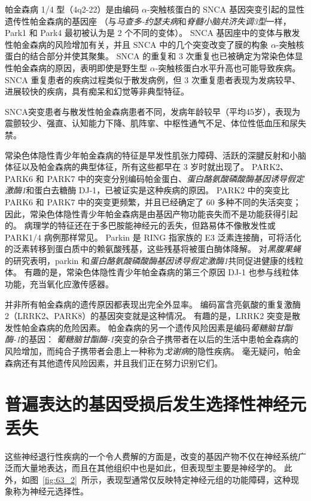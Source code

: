 帕金森病 1/4 型（4q2-22）是由编码 $\alpha$-突触核蛋白的 SNCA 基因突变引起的显性遗传性帕金森病的基因座
（与\textit{马查多-约瑟夫病}和\textit{脊髓小脑共济失调3型}一样，Park1 和 Park4 最初被认为是 2 个不同的变体）。
SNCA 基因座中的变体与散发性帕金森病的风险增加有关，并且 SNCA 中的几个突变改变了膜的构象 $\alpha$-突触核蛋白的结合部分并使其聚集。
SNCA 的重复和 3 次重复也已被确定为常染色体显性帕金森病的原因，表明即使是野生型 $\alpha$-突触核蛋白水平升高也可能导致疾病。
SNCA 重复患者的疾病过程类似于散发病例，但 3 次重复患者表现为发病较早、进展较快的疾病，具有痴呆和幻觉等非典型特征。


SNCA突变患者与散发性帕金森病患者不同，发病年龄较早（平均45岁），表现为震颤较少、强直、认知能力下降、肌阵挛、中枢性通气不足、体位性低血压和尿失禁。


常染色体隐性青少年帕金森病的特征是早发性肌张力障碍、活跃的深腱反射和小脑体征以及帕金森病的典型体征，所有这些都早在 3 岁时就出现了。
PARK2、PARK6 和 PARK7 中的突变分别编码帕金蛋白、\textit{蛋白酪氨酸磷酸酶基因诱导假定激酶1}和蛋白去糖酶 DJ-1，已被证实是这种疾病的原因。
PARK2 中的突变比 PARK6 和 PARK7 中的突变更频繁，并且已经确定了 60 多种不同的失活突变；
因此，常染色体隐性青少年帕金森病是由基因产物功能丧失而不是功能获得引起的。
病理学的特征还在于多巴胺能神经元的丢失，但路易体不像散发性或 PARK1/4 病例那样常见。
Parkin 是 RING 指家族的 E3 泛素连接酶，可将活化的泛素转移到蛋白质中的赖氨酸残基，这些残基将被蛋白酶体降解。
对\textit{黑腹果蝇}的研究表明，parkin 和\textit{蛋白酪氨酸磷酸酶基因诱导假定激酶1}共同促进健康的线粒体。
有趣的是，常染色体隐性青少年帕金森病的第三个原因 DJ-1 也参与线粒体功能，充当氧化应激传感器。


并非所有帕金森病的遗传原因都表现出完全外显率。
编码富含亮氨酸的重复激酶 2（LRRK2、PARK8）的基因突变就是这种情况。
有趣的是，LRRK2 突变是散发性帕金森病的危险因素。
帕金森病的另一个遗传风险因素是编码\textit{葡糖脑甘酯酶-1}的基因：
\textit{葡糖脑甘酯酶-1}突变的杂合子携带者在以后的生活中患帕金森病的风险增加，而纯合子携带者会患上一种称为\textit{戈谢病}的隐性疾病。
毫无疑问，帕金森病还有其他遗传风险因素，并且我们正在努力识别它们。



\section{普遍表达的基因受损后发生选择性神经元丢失}

这些神经退行性疾病的一个令人费解的方面是，改变的基因产物不仅在神经系统广泛而大量地表达，而且在其他组织中也是如此，但表现型主要是神经学的。
此外，如图~\ref{fig:63_2}~所示，表现型通常仅反映特定神经元组的功能障碍，这种现象称为神经元选择性。


